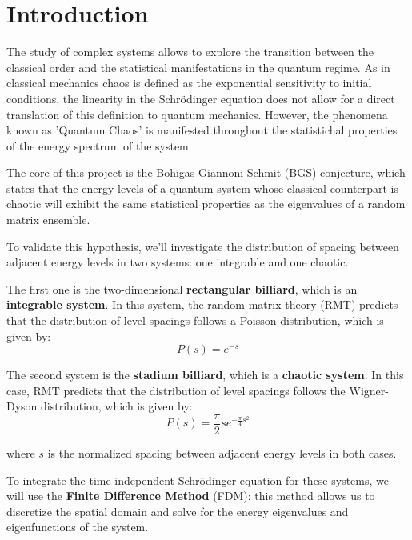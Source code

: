 
\section{Introduction}

The study of complex systems allows to explore the transition between the classical order and the statistical manifestations in the quantum regime. As in classical mechanics chaos is defined as the exponential sensitivity to initial conditions, the linearity in the Schrödinger equation does not allow for a direct translation of this definition to quantum mechanics. 
However, the phenomena known as 'Quantum Chaos' is manifested throughout the statistichal properties of the energy spectrum of the system.

The core of this project is the  Bohigas-Giannoni-Schmit (BGS) conjecture, which states that the energy levels of a quantum system whose classical counterpart is chaotic will exhibit the same statistical properties as the eigenvalues of a random matrix ensemble. 

To validate this hypothesis, we'll investigate the distribution of spacing between adjacent energy levels in two systems: one integrable and one chaotic. 

The first one is the two-dimensional \textbf{rectangular billiard}, which is an \textbf{integrable system}. In this system, the random matrix theory (RMT) predicts that the distribution of level spacings follows a Poisson distribution, which is given by:
\begin{equation}
P(s) = e^{-s}
\label{eq:Poisson_dist}
\end{equation}


The second system is the \textbf{stadium billiard}, which is a \textbf{chaotic system}. In this case, RMT predicts that the distribution of level spacings follows the Wigner-Dyson distribution, which is given by:
\begin{equation}
    P(s) = \frac{\pi}{2} s e^{-\frac{\pi}{4} s^2}
    \label{eq:Wigner-Dyson_dist}
\end{equation}

where $s$ is the normalized spacing between adjacent energy levels in both cases.

To integrate the time independent Schrödinger equation for these systems, we will use the \textbf{Finite Difference Method} (FDM): this method allows us to discretize the spatial domain and solve for the energy eigenvalues and eigenfunctions of the system.
